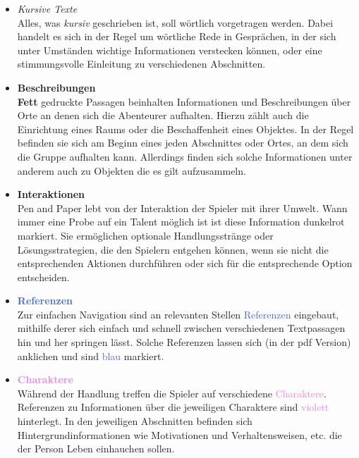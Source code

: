 \begin{itemize}
  \item \textit{Kursive Texte} \\
  Alles, was \textit{kursiv} geschrieben ist, soll wörtlich vorgetragen werden. Dabei handelt es sich in der Regel
  um wörtliche Rede in Gesprächen, in der sich unter Umständen wichtige Informationen verstecken können, oder eine
  stimmungsvolle Einleitung zu verschiedenen Abschnitten.

  \say{\lipsum[1-3]}

  \item \textbf{Beschreibungen} \\
  \textbf{Fett} gedruckte Passagen beinhalten Informationen und Beschreibungen über Orte an denen sich die
  Abenteurer aufhalten. Hierzu zählt auch die Einrichtung eines Raums oder die Beschaffenheit eines Objektes.
  In der Regel befinden sie sich am Beginn eines jeden Abschnittes oder Ortes, an dem sich die Gruppe aufhalten
  kann. Allerdings finden sich solche Informationen unter anderem auch zu Objekten die es gilt aufzusammeln.

  \item \textcolor{RoyalRed}{\textbf{Interaktionen}} \\
  Pen and Paper lebt von der \textcolor{RoyalRed}{Interaktion} der Spieler mit ihrer Umwelt. Wann immer eine Probe auf ein Talent
  möglich ist ist diese Information \textcolor{RoyalRed}{dunkelrot} markiert. Sie ermöglichen optionale Handlungsstränge oder
  Lösungsstrategien, die den Spielern entgehen können, wenn sie nicht die entsprechenden Aktionen durchführen oder
  sich für die entsprechende Option entscheiden.

  \item \textcolor{RoyalBlue}{\textbf{Referenzen}} \\
  Zur einfachen Navigation sind an relevanten Stellen \textcolor{RoyalBlue}{Referenzen} eingebaut, mithilfe derer sich einfach und
  schnell zwischen verschiedenen Textpassagen hin und her springen lässt. Solche Referenzen lassen sich (in der pdf
  Version) anklichen und sind \textcolor{RoyalBlue}{blau} markiert.

  \item \textcolor{violet}{\textbf{Charaktere}} \\
  Während der Handlung treffen die Spieler auf verschiedene \textcolor{violet}{Charaktere}. Referenzen zu Informationen über
  die jeweiligen Charaktere sind \textcolor{violet}{violett} hinterlegt. In den jeweiligen Abschnitten befinden sich
  Hintergrundinformationen wie Motivationen und Verhaltensweisen, etc. die der Person Leben einhauchen sollen.

\end{itemize}
